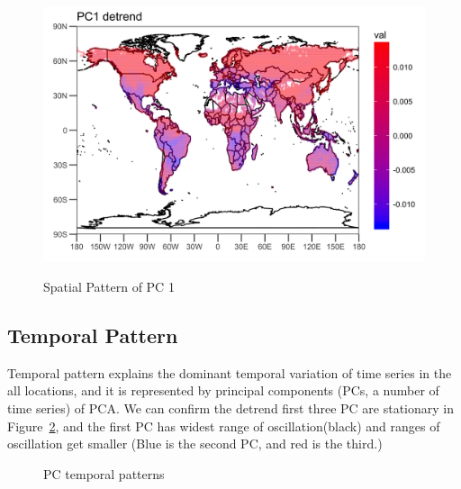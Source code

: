 \documentclass[11pt]{article}
\begin{document}
\begin{figure}
	\centering
	{\includegraphics[width=0.7\linewidth]{../img/loading_PC1_de}}\label{fig:pc1-spatial}
	\caption{Spatial Pattern of PC 1}
\end{figure}

\subsection{Temporal Pattern}
Temporal pattern explains the dominant temporal variation of time series in the all locations, and it is represented by principal components (PCs, a number of time series) of PCA.  We can confirm the detrend first three PC are stationary in Figure~\ref{fig:pc-tsde}, and the first PC has widest range of oscillation(black) and ranges of oscillation get smaller (Blue is the second PC, and red is the third.)
\begin{figure}
	\centering
	\label{fig:ts2}
	\caption{PC temporal patterns}
	\label{fig:pc-tsde}
\end{figure}
\end{document}
